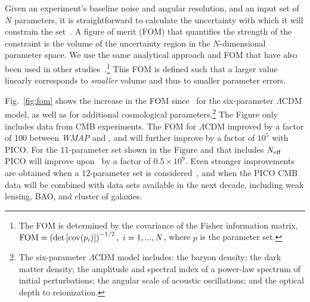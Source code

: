\documentclass[PICOReport.tex]{subfiles}
\begin{document}
Given an experiment's baseline noise and angular resolution, and an input set of $N$ parameters, it is straightforward to calculate the uncertainty with which it will constrain the set~\citep{core_parameter}. A figure of merit (FOM) that quantifies the strength of the constraint is the volume of the uncertainty region in the $N$-dimensional parameter space. We use the same analytical approach and FOM that have also been used in other studies~\citep{core_parameter,Wang2008,pdg2018,Namikawa2010}.\footnote{The FOM is determined by the covariance of the Fisher information matrix, ${\rm FOM} = \left( \det \left[ \mbox{cov} ( p_i)  \right] \right)^{-1/2},\,\, i=1, ..., N$, where $p$ is the parameter set.} This FOM is defined such that a larger value linearly corresponds to {\it smaller} volume and thus to smaller parameter errors. 

Fig.~\ref{fig:fom} shows the increase in the FOM since \cobe\ for the six-parameter $\Lambda$CDM model, as well as for additional cosmological parameters.\footnote{The six-parameter $\Lambda$CDM model includes: the baryon density; the dark matter density; the amplitude and spectral index of a power-law spectrum of initial perturbations; the angular scale of acoustic oscillations; and the optical depth to reionization.} The Figure only includes data from CMB experiments. The FOM for $\Lambda$CDM improved by a factor of 100 between {\it WMAP} and \planck , and will further improve by a factor of $10^{5}$ with PICO. For the 11-parameter set shown in the Figure and that includes ${N_{\rm eff}}$ PICO will improve upon \planck\ by a factor of $0.5\times10^{9}$.  
Even stronger improvements are obtained when a 12-parameter set is considered~\citep{picoweb_lcdm}, and when the PICO CMB data will be combined with data sets available in the next decade, including weak lensing, BAO, and cluster of galaxies. 

\end{document}
